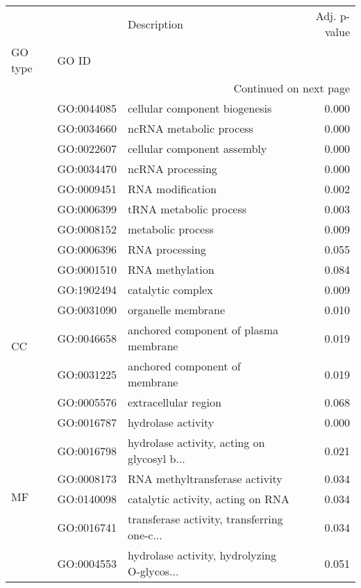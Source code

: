 \begin{longtable}{lllr}
\toprule
   &            &                                  Description &  Adj. p-value \\
GO type & GO ID &                                              &               \\
\midrule
\endhead
\midrule
\multicolumn{4}{r}{{Continued on next page}} \\
\midrule
\endfoot

\bottomrule
\endlastfoot
\multirow{9}{*}{BP} & GO:0044085 &                cellular component biogenesis &         0.000 \\
   & GO:0034660 &                      ncRNA metabolic process &         0.000 \\
   & GO:0022607 &                  cellular component assembly &         0.000 \\
   & GO:0034470 &                             ncRNA processing &         0.000 \\
   & GO:0009451 &                             RNA modification &         0.002 \\
   & GO:0006399 &                       tRNA metabolic process &         0.003 \\
   & GO:0008152 &                            metabolic process &         0.009 \\
   & GO:0006396 &                               RNA processing &         0.055 \\
   & GO:0001510 &                              RNA methylation &         0.084 \\
\cline{1-4}
\multirow{5}{*}{CC} & GO:1902494 &                            catalytic complex &         0.009 \\
   & GO:0031090 &                           organelle membrane &         0.010 \\
   & GO:0046658 &        anchored component of plasma membrane &         0.019 \\
   & GO:0031225 &               anchored component of membrane &         0.019 \\
   & GO:0005576 &                         extracellular region &         0.068 \\
\cline{1-4}
\multirow{6}{*}{MF} & GO:0016787 &                           hydrolase activity &         0.000 \\
   & GO:0016798 &  hydrolase activity, acting on glycosyl b... &         0.021 \\
   & GO:0008173 &               RNA methyltransferase activity &         0.034 \\
   & GO:0140098 &            catalytic activity, acting on RNA &         0.034 \\
   & GO:0016741 &  transferase activity, transferring one-c... &         0.034 \\
   & GO:0004553 &  hydrolase activity, hydrolyzing O-glycos... &         0.051 \\
\end{longtable}
